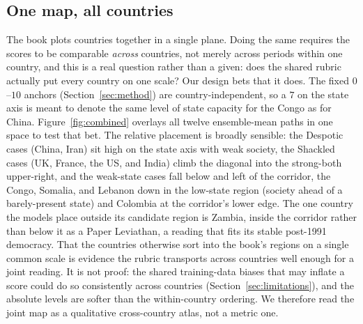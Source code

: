 \documentclass[twocolumn,10pt]{article}
\begin{document}
\subsection{One map, all countries}
\label{sec:combined}
The book plots countries together in a single plane. Doing the same requires the
scores to be comparable \emph{across} countries, not merely across periods within
one country, and this is a real question rather than a given: does the shared
rubric actually put every country on one scale? Our design bets that it does. The
fixed $0$--$10$ anchors (Section~\ref{sec:method}) are country-independent, so a
$7$ on the state axis is meant to denote the same level of state capacity for the
Congo as for China. Figure~\ref{fig:combined} overlays all twelve ensemble-mean
paths in one space to test that bet. The relative placement is broadly sensible:
the Despotic cases (China, Iran) sit high on the state axis with weak society, the
Shackled cases (UK, France, the US, and India) climb the diagonal into the
strong-both upper-right, and the weak-state cases fall below and left of the
corridor, the Congo, Somalia, and Lebanon down in the low-state region (society
ahead of a barely-present state) and Colombia at the corridor's lower edge.
The one country the models place outside its candidate region is Zambia, inside
the corridor rather than below it as a Paper Leviathan, a reading that fits its
stable post-1991 democracy. That the countries otherwise sort
into the book's regions on a single common scale is evidence the rubric transports
across countries well enough for a joint reading. It is not proof: the shared
training-data biases that may inflate a score could do so consistently across
countries (Section~\ref{sec:limitations}), and the absolute levels are softer than
the within-country ordering. We therefore read the joint map as a qualitative
cross-country atlas, not a metric one.
\end{document}
